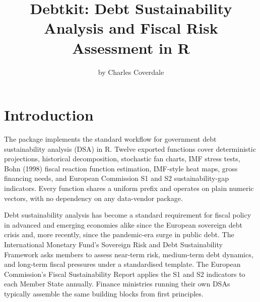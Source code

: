 \title{Debtkit: Debt Sustainability Analysis and Fiscal Risk Assessment in R}


\author{by Charles Coverdale}

\maketitle


\section{Introduction}\label{introduction}

The  package implements the standard workflow for
government debt sustainability analysis (DSA) in R. Twelve exported
functions cover deterministic projections, historical
decomposition, stochastic fan charts, IMF stress tests, Bohn (1998)
fiscal reaction function estimation, IMF-style heat maps, gross
financing needs, and European Commission S1 and S2
sustainability-gap indicators. Every function shares a uniform
 prefix and operates on plain numeric vectors, with no
dependency on any data-vendor package.

Debt sustainability analysis has become a standard requirement for
fiscal policy in advanced and emerging economies alike since the
European sovereign debt crisis and, more recently, since the
pandemic-era surge in public debt. The International Monetary
Fund's Sovereign Risk and Debt Sustainability Framework
\citep{imf2022} asks members to assess near-term risk, medium-term
debt dynamics, and long-term fiscal pressures under a standardised
template. The European Commission's Fiscal Sustainability Report
applies the S1 and S2 indicators \citep{ec2024fsr} to each Member State
annually. Finance ministries running their own DSAs typically
assemble the same building blocks from first principles.

